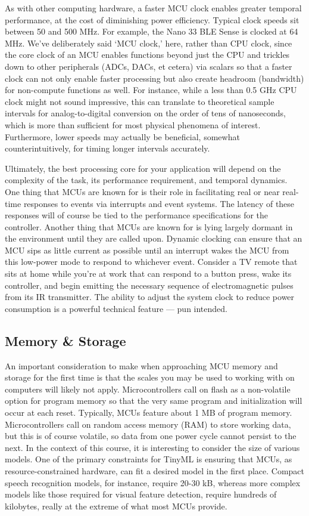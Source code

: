As with other computing hardware, a faster MCU clock enables greater temporal performance, at the cost of diminishing power efficiency. Typical clock speeds sit between 50 and 500 MHz. For example, the Nano 33 BLE Sense is clocked at 64 MHz. We’ve deliberately said ‘MCU clock,’ here, rather than CPU clock, since the core clock of an MCU enables functions beyond just the CPU and trickles down to other peripherals (ADCs, DACs, et cetera) via scalars so that a faster clock can not only enable faster processing but also create headroom (bandwidth) for non-compute functions as well. For instance, while a less than 0.5 GHz CPU clock might not sound impressive, this can translate to theoretical sample intervals for analog-to-digital conversion on the order of tens of nanoseconds, which is more than sufficient for most physical phenomena of interest. Furthermore, lower speeds may actually be beneficial, somewhat counterintuitively, for timing longer intervals accurately. 

Ultimately, the best processing core for your application will depend on the complexity of the task, its performance requirement, and temporal dynamics. One thing that MCUs are known for is their role in facilitating real or near real-time responses to events via interrupts and event systems. The latency of these responses will of course be tied to the performance specifications for the controller. Another thing that MCUs are known for is lying largely dormant in the environment until they are called upon. Dynamic clocking can ensure that an MCU sips as little current as possible until an interrupt wakes the MCU from this low-power mode to respond to whichever event. Consider a TV remote that sits at home while you’re at work that can respond to a button press, wake its controller, and begin emitting the necessary sequence of electromagnetic pulses from its IR transmitter. The ability to adjust the system clock to reduce power consumption is a powerful technical feature — pun intended.

\subsection{Memory \& Storage}

An important consideration to make when approaching MCU memory and storage for the first time is that the scales you may be used to working with on computers will likely not apply. Microcontrollers call on flash as a non-volatile option for program memory so that the very same program and initialization will occur at each reset. Typically, MCUs feature about 1 MB of program memory. Microcontrollers call on random access memory (RAM) to store working data, but this is of course volatile, so data from one power cycle cannot persist to the next. In the context of this course, it is interesting to consider the size of various models. One of the primary constraints for TinyML is ensuring that MCUs, as resource-constrained hardware, can fit a desired model in the first place. Compact speech recognition models, for instance, require 20-30 kB, whereas more complex models like those required for visual feature detection, require hundreds of kilobytes, really at the extreme of what most MCUs provide.

